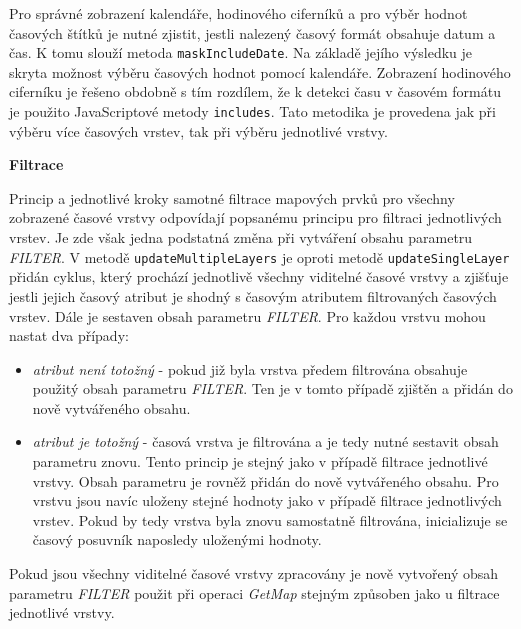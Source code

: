 Pro správné zobrazení kalendáře, hodinového ciferníků a
pro výběr hodnot časových štítků je nutné zjistit, jestli
nalezený časový formát obsahuje datum a čas. K tomu slouží metoda
\verb|maskIncludeDate|. Na základě jejího výsledku je skryta možnost
výběru časových hodnot pomocí kalendáře. Zobrazení hodinového
ciferníku je řešeno obdobně s tím rozdílem, že k detekci času v
časovém formátu je použito JavaScriptové metody \verb|includes|. Tato
metodika je provedena jak při výběru více časových vrstev, tak při
výběru jednotlivé vrstvy.

\bigskip
\noindent \textbf{Filtrace}

Princip a jednotlivé kroky samotné filtrace mapových prvků pro všechny
zobrazené časové vrstvy odpovídají popsanému principu pro filtraci
jednotlivých vrstev. Je zde však jedna podstatná změna při vytváření
obsahu parametru \textit{FILTER}. V metodě \verb|updateMultipleLayers| je
oproti metodě \verb|updateSingleLayer| přidán cyklus, který prochází
jednotlivě všechny viditelné časové vrstvy a zjišťuje jestli jejich
časový atribut je shodný s časovým atributem filtrovaných časových
vrstev. Dále je sestaven obsah parametru \textit{FILTER}. Pro každou vrstvu
mohou nastat dva případy:
\begin{itemize}
\item\textit{atribut není totožný} - pokud již byla
vrstva předem filtrována obsahuje použitý obsah parametru
\textit{FILTER}. Ten je v tomto případě zjištěn a
přidán do nově vytvářeného obsahu.
\item\textit{atribut je totožný} - časová vrstva je
filtrována a je tedy nutné sestavit obsah parametru
znovu. Tento princip je stejný jako v případě filtrace
jednotlivé vrstvy. Obsah parametru je rovněž přidán do
nově vytvářeného obsahu. Pro vrstvu jsou navíc uloženy
stejné hodnoty jako v případě filtrace jednotlivých
vrstev. Pokud by tedy vrstva byla znovu samostatně
filtrována, inicializuje se časový posuvník naposledy
uloženými hodnoty.
\end{itemize}
Pokud jsou všechny viditelné časové vrstvy zpracovány je nově vytvořený
obsah parametru \textit{FILTER} použit při operaci \textit{GetMap} stejným
způsoben jako u filtrace jednotlivé vrstvy.

